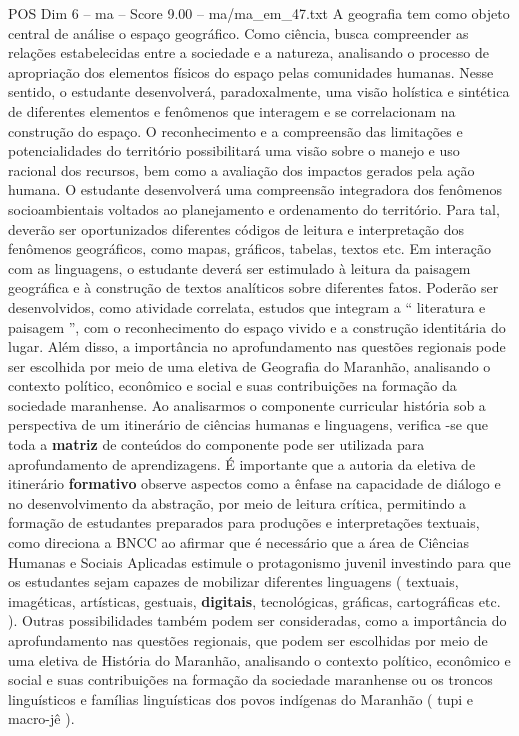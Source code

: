 \begin{textsample}{POS Dim 6 – ma – Score 9.00 – ma/ma\_em\_47.txt}
A geografia tem como objeto central de análise o espaço geográfico.
Como ciência, busca compreender as relações estabelecidas entre a sociedade e a natureza, analisando o processo de apropriação dos elementos físicos do espaço pelas comunidades humanas.
Nesse sentido, o estudante desenvolverá, paradoxalmente, uma visão holística e sintética de diferentes elementos e fenômenos que interagem e se correlacionam na construção do espaço.
O reconhecimento e a compreensão das limitações e potencialidades do território possibilitará uma visão sobre o manejo e uso racional dos recursos, bem como a avaliação dos impactos gerados pela ação humana.
O estudante desenvolverá uma compreensão integradora dos fenômenos socioambientais voltados ao planejamento e ordenamento do território.
Para tal, deverão ser oportunizados diferentes códigos de leitura e interpretação dos fenômenos geográficos, como mapas, gráficos, tabelas, textos etc.
Em interação com as linguagens, o estudante deverá ser estimulado à leitura da paisagem geográfica e à construção de textos analíticos sobre diferentes fatos.
Poderão ser desenvolvidos, como atividade correlata, estudos que integram a “ literatura e paisagem ”, com o reconhecimento do espaço vivido e a construção identitária do lugar.
Além disso, a importância no aprofundamento nas questões regionais pode ser escolhida por meio de uma eletiva de Geografia do Maranhão, analisando o contexto político, econômico e social e suas contribuições na formação da sociedade maranhense.
Ao analisarmos o componente curricular história sob a perspectiva de um itinerário de ciências humanas e linguagens, verifica -se que toda a \textbf{matriz} de conteúdos do componente pode ser utilizada para aprofundamento de aprendizagens.
É importante que a autoria da eletiva de itinerário \textbf{formativo} observe aspectos como a ênfase na capacidade de diálogo e no desenvolvimento da abstração, por meio de leitura crítica, permitindo a formação de estudantes preparados para produções e interpretações textuais, como direciona a BNCC ao afirmar que é necessário que a área de Ciências Humanas e Sociais Aplicadas estimule o protagonismo juvenil investindo para que os estudantes sejam capazes de mobilizar diferentes linguagens ( textuais, imagéticas, artísticas, gestuais, \textbf{digitais}, tecnológicas, gráficas, cartográficas etc. ).
Outras possibilidades também podem ser consideradas, como a importância do aprofundamento nas questões regionais, que podem ser escolhidas por meio de uma eletiva de História do Maranhão, analisando o contexto político, econômico e social e suas contribuições na formação da sociedade maranhense ou os troncos linguísticos e famílias linguísticas dos povos indígenas do Maranhão ( tupi e macro-jê ).

\end{textsample}
